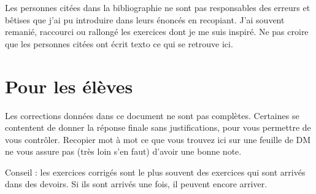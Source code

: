     Les personnes citées dans la bibliographie ne sont pas responsables des erreurs et bêtises que j'ai pu introduire dans leurs énoncés en recopiant. J'ai souvent remanié, raccourci ou rallongé les exercices dont je me suis inspiré. Ne pas croire que les personnes citées ont écrit texto ce qui se retrouve ici.




\section*{Pour les élèves}

Les corrections données dans ce document ne sont pas complètes. Certaines se contentent de donner la réponse finale sans justifications, pour vous permettre de vous contrôler. Recopier mot à mot ce que vous trouvez ici sur une feuille de DM ne vous assure pas (très loin s'en faut) d'avoir une bonne note.

Conseil : les exercices corrigés sont le plus souvent des exercices qui sont arrivés dans des devoirs. Si ils sont arrivés une fois, il peuvent encore arriver.
